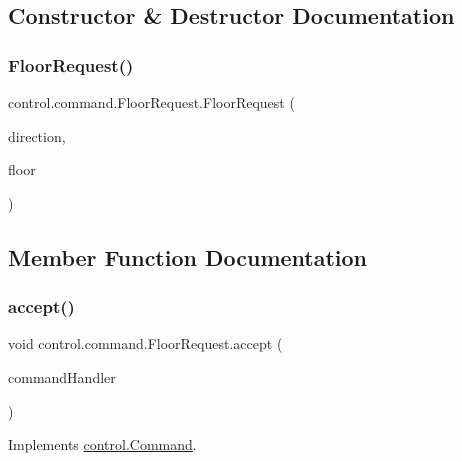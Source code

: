 \subsection{Constructor \& Destructor Documentation}
\mbox{\label{classcontrol_1_1command_1_1_floor_request_a03685a59d9f54c5057713039fa580369}} 
\subsubsection{\texorpdfstring{FloorRequest()}{FloorRequest()}}
{\footnotesize\ttfamily control.\+command.\+Floor\+Request.\+Floor\+Request (\begin{DoxyParamCaption}\item[{\mbox{\hyperlink{enumcontrol_1_1command_1_1_direction}{Direction}}}]{direction,  }\item[{int}]{floor }\end{DoxyParamCaption})}



\subsection{Member Function Documentation}
\mbox{\label{classcontrol_1_1command_1_1_floor_request_a89db76c1649b41ee844fb79898ce4de2}} 
\subsubsection{\texorpdfstring{accept()}{accept()}}
{\footnotesize\ttfamily void control.\+command.\+Floor\+Request.\+accept (\begin{DoxyParamCaption}\item[{\mbox{\hyperlink{interfacecontrol_1_1_command_handler}{Command\+Handler}}}]{command\+Handler }\end{DoxyParamCaption})}



Implements \mbox{\hyperlink{interfacecontrol_1_1_command_ab81fb31e9d98dfbfbfb7026a5bc823a6}{control.\+Command}}.

